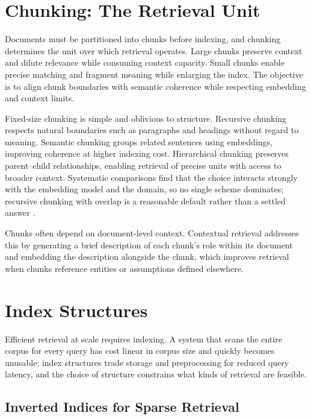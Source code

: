 \documentclass[11pt]{book}
\begin{document}
\section{Chunking: The Retrieval Unit}

Documents must be partitioned into chunks before indexing, and chunking determines the unit over which retrieval operates. Large chunks preserve context and dilute relevance while consuming context capacity. Small chunks enable precise matching and fragment meaning while enlarging the index. The objective is to align chunk boundaries with semantic coherence while respecting embedding and context limits.

Fixed-size chunking is simple and oblivious to structure. Recursive chunking respects natural boundaries such as paragraphs and headings without regard to meaning. Semantic chunking groups related sentences using embeddings, improving coherence at higher indexing cost. Hierarchical chunking preserves parent--child relationships, enabling retrieval of precise units with access to broader context. Systematic comparisons find that the choice interacts strongly with the embedding model and the domain, so no single scheme dominates; recursive chunking with overlap is a reasonable default rather than a settled answer \cite{chunkstudy2025, chunkeval2026}.

Chunks often depend on document-level context. Contextual retrieval \cite{anthropic2024contextual} addresses this by generating a brief description of each chunk's role within its document and embedding the description alongside the chunk, which improves retrieval when chunks reference entities or assumptions defined elsewhere.

\section{Index Structures}

Efficient retrieval at scale requires indexing. A system that scans the entire corpus for every query has cost linear in corpus size and quickly becomes unusable; index structures trade storage and preprocessing for reduced query latency, and the choice of structure constrains what kinds of retrieval are feasible.

\subsection{Inverted Indices for Sparse Retrieval}
\end{document}
